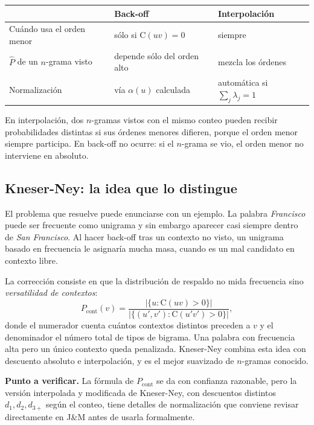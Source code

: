 \documentclass[11pt,letterpaper]{article}
\newcommand{\Count}{\mathrm{C}}
\begin{document}
\begin{center}
\begin{tabular}{lll}
\toprule
 & Back-off & Interpolación \\
\midrule
Cuándo usa el orden menor & sólo si $\Count(uv)=0$ & siempre \\
$\hat P$ de un $n$-grama visto & depende sólo del orden alto & mezcla los
órdenes \\
Normalización & vía $\alpha(u)$ calculada & automática si $\sum_j\lambda_j=1$ \\
\bottomrule
\end{tabular}
\end{center}

\begin{idea}[title={La distinción operativa}]
En interpolación, dos $n$-gramas vistos con el mismo conteo pueden recibir
probabilidades distintas si sus órdenes menores difieren, porque el orden menor
siempre participa. En back-off no ocurre: si el $n$-grama se vio, el orden menor
no interviene en absoluto.
\end{idea}

\subsection{Kneser-Ney: la idea que lo distingue}

El problema que resuelve puede enunciarse con un ejemplo. La palabra
\emph{Francisco} puede ser frecuente como unigrama y sin embargo aparecer casi
siempre dentro de \emph{San Francisco}. Al hacer back-off tras un contexto no
visto, un unigrama basado en frecuencia le asignaría mucha masa, cuando es un
mal candidato en contexto libre.

La corrección consiste en que la distribución de respaldo no mida frecuencia
sino \emph{versatilidad de contextos}:
\[
P_{\text{cont}}(v) = \frac{|\{u : \Count(uv)>0\}|}{|\{(u',v') :
\Count(u'v')>0\}|},
\]
donde el numerador cuenta cuántos contextos distintos preceden a $v$ y el
denominador el número total de tipos de bigrama. Una palabra con frecuencia alta
pero un único contexto queda penalizada. Kneser-Ney combina esta idea con
descuento absoluto e interpolación, y es el mejor suavizado de $n$-gramas
conocido.

\begin{observacion}
\textbf{Punto a verificar.} La fórmula de $P_{\text{cont}}$ se da con confianza
razonable, pero la versión interpolada y modificada de Kneser-Ney, con
descuentos distintos $d_1, d_2, d_{3+}$ según el conteo, tiene detalles de
normalización que conviene revisar directamente en J\&M antes de usarla
formalmente.
\end{observacion}
\end{document}
